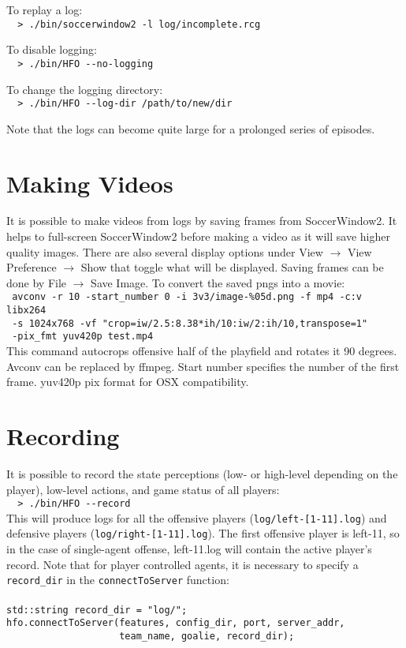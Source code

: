 \documentclass[12pt]{article}
\begin{document}
\noindent To replay a log: \\
\verb+  > ./bin/soccerwindow2 -l log/incomplete.rcg+

\noindent To disable logging:\\
\verb+  > ./bin/HFO --no-logging +

\noindent To change the logging directory:\\
\verb+  > ./bin/HFO --log-dir /path/to/new/dir +

Note that the logs can become quite large for a prolonged series of
episodes.

\section{Making Videos}
It is possible to make videos from logs by saving frames from
SoccerWindow2. It helps to full-screen SoccerWindow2 before making a
video as it will save higher quality images. There are also several
display options under View $\rightarrow$ View Preference $\rightarrow$
Show that toggle what will be displayed. Saving frames can be done by
File $\rightarrow$ Save Image. To convert the saved pngs into a
movie:\\

\noindent \verb+ avconv -r 10 -start_number 0 -i 3v3/image-%05d.png -f mp4 -c:v libx264+\\
\noindent \verb+ -s 1024x768 -vf "crop=iw/2.5:8.38*ih/10:iw/2:ih/10,transpose=1" +\\
\noindent \verb+ -pix_fmt yuv420p test.mp4 +\\

This command autocrops offensive half of the playfield and rotates it
90 degrees. Avconv can be replaced by ffmpeg. Start number specifies
the number of the first frame. yuv420p pix format for OSX
compatibility.

\section{Recording}

It is possible to record the state perceptions (low- or high-level depending on
the player), low-level actions, and game status of all players:\\

\noindent \verb+  > ./bin/HFO --record + \\

This will produce logs for all the offensive players
(\verb+log/left-[1-11].log+) and defensive players
(\verb+log/right-[1-11].log+). The first offensive player is left-11,
so in the case of single-agent offense, left-11.log will contain the
active player's record. Note that for player controlled agents, it is
necessary to specify a \verb+record_dir+ in the \verb+connectToServer+
function:\\
\\
\noindent \verb+std::string record_dir = "log/";+\\
\noindent \verb+hfo.connectToServer(features, config_dir, port, server_addr,+\\
\noindent \verb+                    team_name, goalie, record_dir);+\\
\end{document}
